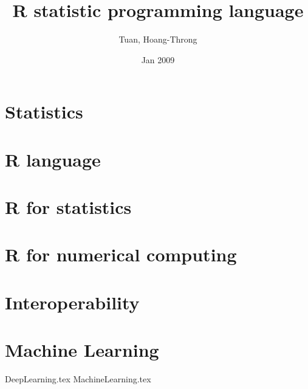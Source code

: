 \documentclass[11pt]{book}
\begin{document}
\author{Tuan, Hoang-Throng}
\title{R statistic programming language}
\date{Jan 2009}

\frontmatter
\tableofcontents
%

\mainmatter
{}

\def\ci{100\%\times (1-\alpha)}
\def\pr{\text{Pr}}
\def\pval{p-\text{value}}
\def\max{{\text{max}}}

\part{Statistics}






\part{R language}








\part{R for statistics}












\part{R for numerical computing}



\part{Interoperability}




\part{Machine Learning}
{DeepLearning.tex}
{MachineLearning.tex}
\end{document}
